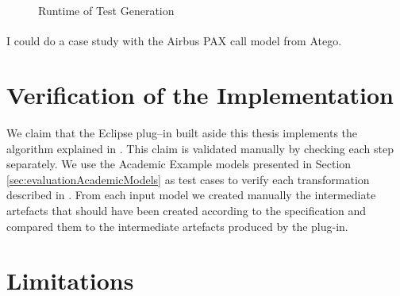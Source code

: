 \begin{figure}
%
\caption{Runtime of Test Generation }
\label{fig:MaxPlot}
\end{figure}







I could do a case study with the Airbus PAX call model from Atego\textsuperscript{\textregistered }.
\section{Verification of the Implementation}
We claim that the Eclipse plug--in built aside this thesis implements the algorithm explained in . This claim is validated manually by checking each step separately. We use the Academic Example models presented in Section \ref{sec:evaluationAcademicModels} as test cases to verify each transformation described in . From each input model we created manually the intermediate artefacts that should have been created according to the specification and compared them to the intermediate artefacts produced by the plug-in.
\section{Limitations}
\label{sec:evaluationLimitations}
